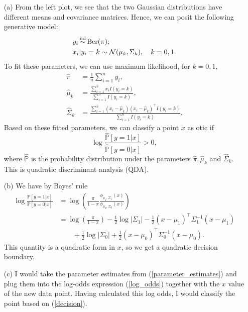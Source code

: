 \begin{itemize}
\item[(a)] From the left plot, we see that the two Gaussian distributions have different means and covariance matrices. Hence, we can posit the following generative model:
	\begin{equation}
	\begin{split}
	&y_i \simiid \text{Ber}(\pi); \\
	&x_i|y_i=k \sim \mathcal N(\mu_k, \Sigma_k), \quad k = 0, 1. 
	\end{split}
	\end{equation}
	To fit these parameters, we can use maximum likelihood, for $k=0,1$,
	\begin{align}
	\hat \pi &= \frac{1}{n}\sum_{i = 1}^n y_i,\nonumber  \\
	 \hat \mu_k &= \frac{\sum_{i = 1}^n x_i I(y_i = k)}{\sum_{i = 1}^n I(y_i = k)},\nonumber  \\
	  \hat \Sigma_k &= \frac{\sum_{i = 1}^n (x_i-\hat \mu_k)(x_i - \hat \mu_k)^\top  I(y_i = k)}{\sum_{i = 1}^n I(y_i = k)}.
	\label{parameter_estimates}
	\end{align}
	Based on these fitted parameters, we can classify a point $x$ as otic if
	\begin{equation}
	\log \frac{\hat{\mathbb P}[y = 1|x]}{\hat{\mathbb P}[y = 0|x]} > 0,
	\label{decision}
	\end{equation}
	where $\hat{\mathbb{P}}$ is the probability distribution under the parameters $\hat{\pi}, \hat{\mu}_k$ and $\hat{\Sigma}_k$. This is quadratic discriminant analysis (QDA).
\item[(b)]  We have by Bayes' rule
	\begin{align}
	\log \frac{\mathbb P[y = 1|x]}{\mathbb P[y = 0|x]} &= \log\left(\frac{\pi}{1-\pi}\frac{\phi_{\mu_1, \Sigma_1}(x)}{\phi_{\mu_0, \Sigma_0}(x)}\right) \nonumber \\
	&= \log\left(\frac{\pi}{1 - \pi}\right) -\frac12 \log |\Sigma_1| - \frac{1}{2}(x - \mu_1)^\top  \Sigma_1^{-1}(x - \mu_1) \nonumber \\ &\qquad+ \frac12 \log |\Sigma_0| + \frac{1}{2}(x - \mu_0)^\top  \Sigma_0^{-1}(x - \mu_0). \label{log_odds}
	\end{align}
This quantity is a quadratic form in $x$, so we get a quadratic decision boundary. 

\item[(c)] I would take the parameter estimates from (\ref{parameter_estimates}) and plug them into the log-odds expression (\ref{log_odds}) together with the $x$ value of the new data point. Having calculated this log odds, I would classify the point based on (\ref{decision}).


\end{itemize}
